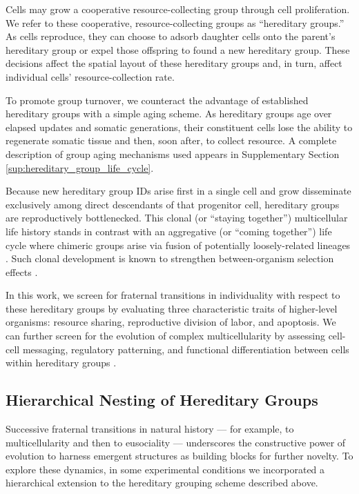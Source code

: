 Cells may grow a cooperative resource-collecting group through cell proliferation.
We refer to these cooperative, resource-collecting groups as ``hereditary groups.''
As cells reproduce, they can choose to adsorb daughter cells onto the parent's hereditary group or expel those offspring to found a new hereditary group.
These decisions affect the spatial layout of these hereditary groups and, in turn, affect individual cells' resource-collection rate.

To promote group turnover, we counteract the advantage of established hereditary groups with a simple aging scheme.
As hereditary groups age over elapsed updates and somatic generations, their constituent cells lose the ability to regenerate somatic tissue and then, soon after, to collect resource.
A complete description of group aging mechanisms used appears in Supplementary Section \ref{sup:hereditary_group_life_cycle}.

Because new hereditary group IDs arise first in a single cell and grow disseminate exclusively among direct descendants of that progenitor cell, hereditary groups are reproductively bottlenecked.
This clonal (or ``staying together'') multicellular life history stands in contrast with an aggregative (or ``coming together'') life cycle where chimeric groups arise via fusion of potentially loosely-related lineages \citep{staps2019emergence}.
Such clonal development is known to strengthen between-organism selection effects \citep{grosberg2007evolution}.

In this work, we screen for fraternal transitions in individuality with respect to these hereditary groups by evaluating three characteristic traits of higher-level organisms: resource sharing, reproductive division of labor, and apoptosis.
We can further screen for the evolution of complex multicellularity by assessing cell-cell messaging, regulatory patterning, and functional differentiation between cells within hereditary groups \cite{knoll2011multiple}.

\subsection{Hierarchical Nesting of Hereditary Groups} \label{sec:hierarchical_nesting}

Successive fraternal transitions in natural history --- for example, to multicellularity and then to eusociality \citep{smith1997major} --- underscores the constructive power of evolution to harness emergent structures as building blocks for further novelty.
To explore these dynamics, in some experimental conditions we incorporated a hierarchical extension to the hereditary grouping scheme described above.

